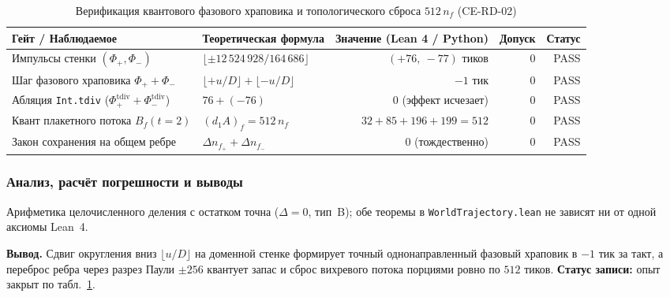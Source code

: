\begin{table}[htbp]
\centering
\footnotesize
\setlength{\tabcolsep}{4pt}
\caption{Верификация квантового фазового храповика и топологического сброса $512\,n_f$ (CE-RD-02)}
\label{tab:exp-ce-rd-02}
\begin{tabular}{@{}llrrr@{}}
\toprule
Гейт / Наблюдаемое & Теоретическая формула & Значение (Lean 4 / Python) & Допуск & Статус \\
\midrule
Импульсы стенки $(\Phi_+, \Phi_-)$ & $\lfloor\pm 12\,524\,928 / 164\,686\rfloor$ & $(+76,\ -77)$ тиков & $0$ & PASS \\
Шаг фазового храповика $\Phi_+ + \Phi_-$ & $\lfloor +u/D\rfloor + \lfloor -u/D\rfloor$ & $-1$ тик & $0$ & PASS \\
Абляция \texttt{Int.tdiv} ($\Phi_+^{\mathrm{tdiv}} + \Phi_-^{\mathrm{tdiv}}$) & $76 + (-76)$ & $0$ (эффект исчезает) & $0$ & PASS \\
Квант плакетного потока $B_f(t=2)$ & $(d_1 A)_f = 512\,n_f$ & $32+85+196+199 = 512$ & $0$ & PASS \\
Закон сохранения на общем ребре & $\Delta n_{f_+} + \Delta n_{f_-}$ & $0$ (тождественно) & $0$ & PASS \\
\bottomrule
\end{tabular}
\end{table}

\subsubsection*{Анализ, расчёт погрешности и выводы}
Арифметика целочисленного деления с остатком точна ($\Delta = 0$, тип~B); обе теоремы в \texttt{WorldTrajectory.lean} не зависят ни от одной аксиомы Lean~4.

\textbf{Вывод.}
Сдвиг округления вниз $\lfloor u/D\rfloor$ на доменной стенке формирует точный однонаправленный фазовый храповик в $-1$ тик за такт, а переброс ребра через разрез Паули $\pm 256$ квантует запас и сброс вихревого потока порциями ровно по $512$ тиков.
\textbf{Статус записи:} опыт закрыт по табл.~\ref{tab:exp-ce-rd-02}.
